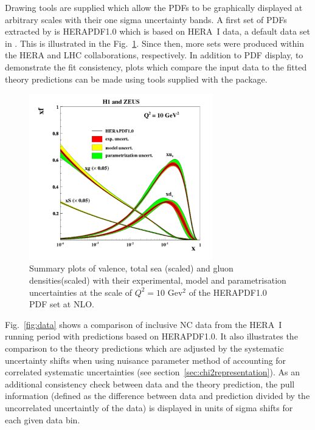 \begin{description}
Drawing tools are supplied which allow the PDFs to be
graphically  displayed at arbitrary scales with their one sigma uncertainty bands. 
A first set of PDFs extracted by \fitter is HERAPDF1.0 \cite{h1zeus:2009} which is based on HERA~I data, a default data set in \fitter. 
This is illustrated in the Fig.~\ref{fig:hera1}. 
Since then, more sets were produced within the HERA and LHC collaborations, respectively.
In addition to PDF display, to demonstrate the fit consistency, plots 
which compare the input data to the fitted theory predictions can be made using
tools supplied with the package.
\begin{figure}[!ht]
   \centering
   \includegraphics[width=8cm]{hera1.pdf}
   \caption{Summary plots of valence, total sea (scaled) and gluon densities(scaled) with their experimental, model and parametrisation uncertainties at the scale of $Q^2=10$ Gev$^2$ of the HERAPDF1.0 PDF set at NLO.}
 \label{fig:hera1}
\end{figure}


Fig.~\ref{fig:data} shows a comparison of inclusive NC data from the HERA~I running period with predictions based on HERAPDF1.0. It also illustrates the comparison to the theory predictions which are adjusted by the  
systematic uncertainty shifts when using nuisance parameter method of accounting for 
correlated systematic uncertainties (see section~\ref{sec:chi2representation}). 
As an additional consistency check between data and the theory prediction, the pull information (defined as the difference between data and prediction divided by the uncorrelated uncertaintly of the data) is displayed in units of sigma shifts for each given data bin.


\end{description}
